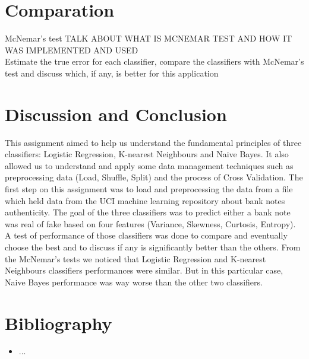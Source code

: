 \documentclass[a4paper]{article}
\begin{document}
\section{Comparation}

\large McNemar's test
TALK ABOUT WHAT IS MCNEMAR TEST AND HOW IT WAS IMPLEMENTED AND USED\\
Estimate the true error for each classifier, compare the classifiers with McNemar's test and discuss which, if any, is better for this application\\


\section{Discussion and Conclusion}
This assignment aimed to help us understand the fundamental principles of three classifiers: Logistic Regression, K-nearest Neighbours and Naive Bayes. It also allowed us to understand and apply some data management techniques such as preprocessing data (Load, Shuffle, Split) and the process of Cross Validation. 
The first step on this assignment was to load and preprocessing the data from a file which held data from the UCI machine learning repository about bank notes authenticity. The goal of the three classifiers was to predict either a bank note was real of fake based on four features (Variance, Skewness, Curtosis, Entropy).
A test of performance of those classifiers was done to compare and eventually choose the best and to discuss if any is significantly better than the others. From the McNemar's tests we noticed that Logistic Regression and K-nearest Neighbours classifiers performances were similar. But in this particular case, Naive Bayes performance was way worse than the other two classifiers.
  

\section{Bibliography}
\begin{itemize}
\item ...\\
\end{itemize}
\end{document}
